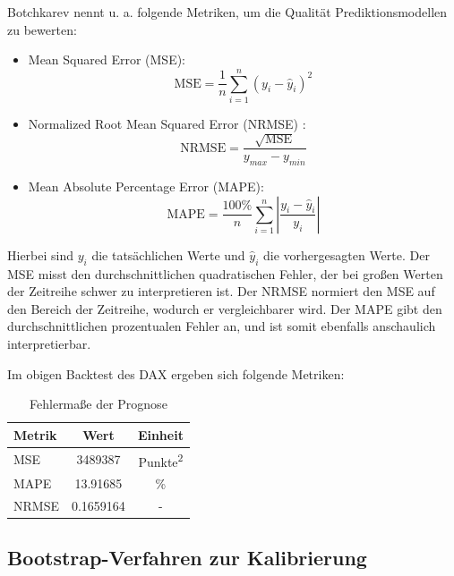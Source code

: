 \begin{lemma}
Botchkarev \cite{Botchkarev2018} nennt u. a. folgende Metriken, um die Qualität Prediktionsmodellen zu bewerten:
\begin{itemize}
    \item Mean Squared Error (MSE): $$\text{MSE} = \frac{1}{n} \sum_{i=1}^n (y_i - \hat{y}_i)^2$$
    \item Normalized Root Mean Squared Error (NRMSE) : $$\text{NRMSE} = \frac{\sqrt{\text{MSE}}}{y_{max} - y_{min}}$$
    \item Mean Absolute Percentage Error (MAPE): $$\text{MAPE} = \frac{100\%}{n} \sum_{i=1}^n \left|\frac{y_i - \hat{y}_i}{y_i}\right|$$
\end{itemize}

Hierbei sind $y_i$ die tatsächlichen Werte und $\hat{y}_i$ die vorhergesagten Werte.
Der MSE misst den durchschnittlichen quadratischen Fehler, der bei großen Werten der Zeitreihe schwer 
zu interpretieren ist. Der NRMSE normiert den MSE auf den Bereich der Zeitreihe,
wodurch er vergleichbarer wird. Der MAPE gibt den durchschnittlichen prozentualen Fehler an, und ist
somit ebenfalls anschaulich interpretierbar.

\end{lemma}

\begin{lemma}
Im obigen Backtest des DAX ergeben sich folgende Metriken:

\begin{table}[h]
    \centering
    \begin{tabular}{lcc}
        \toprule
        Metrik & Wert & Einheit \\
        \midrule
        MSE    & 3489387 & Punkte\textsuperscript{2} \\
        MAPE   & 13.91685   & \% \\
        NRMSE  & 0.1659164 & - \\
        \bottomrule
    \end{tabular}
    \caption{Fehlermaße der Prognose}
    \label{tab:metrics}
\end{table}

\end{lemma}


\subsection{Bootstrap-Verfahren zur Kalibrierung}


